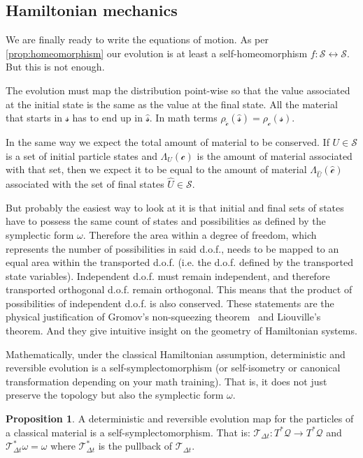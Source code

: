 \documentclass[smallextended]{svjour3}
\numberwithin{equation}{section}
\theoremstyle{definition}
\newtheorem{prop}[equation]{Proposition}
\begin{document}
\subsection{Hamiltonian mechanics}

We are finally ready to write the equations of motion. As per \ref{prop:homeomorphism} our evolution is at least a self-homeomorphism $f:\mathcal{S} \leftrightarrow \mathcal{S}$. But this is not enough.

The evolution must map the distribution point-wise so that the value associated at the initial state is the same as the value at the final state. All the material that starts in $\mathcal{s}$ has to end up in $\hat{\mathcal{s}}$. In math terms $\rho_{\hat{\mathcal{c}}} (\hat{\mathcal{s}}) = \rho_\mathcal{c}(\mathcal{s})$.

In the same way we expect the total amount of material to be conserved. If $U \in \mathcal{S}$ is a set of initial particle states and $\Lambda_U(\mathcal{c})$ is the amount of material associated with that set, then we expect it to be equal to the amount of material $\Lambda_{\hat{U}}(\hat{\mathcal{c}})$ associated with the set of final states $\hat{U} \in \mathcal{S}$.

But probably the easiest way to look at it is that initial and final sets of states have to possess the same count of states and possibilities as defined by the symplectic form $\omega$. Therefore the area within a degree of freedom, which represents the number of possibilities in said d.o.f., needs to be mapped to an equal area within the transported d.o.f. (i.e. the d.o.f. defined by the transported state variables). Independent d.o.f. must remain independent, and therefore transported orthogonal d.o.f. remain orthogonal. This means that the product of possibilities of independent d.o.f. is also conserved. These statements are the physical justification of Gromov's non-squeezing theorem~\cite{Gromov,deGosson,Stewart} and Liouville's theorem. And they give intuitive insight on the geometry of Hamiltonian systems.

Mathematically, under the classical Hamiltonian assumption,  deterministic and reversible evolution is a self-symplectomorphism (or self-isometry or canonical transformation depending on your math training). That is, it does not just preserve the topology but also the symplectic form $\omega$.

\begin{prop}\label{prop:symplectomorphism}
	A deterministic and reversible evolution map for the particles of a classical material is a self-symplectomorphism. That is: $\mathcal{T}_{\Delta t}: T^*\mathcal{Q} \rightarrow T^*\mathcal{Q}$ and $\mathcal{T}_{\Delta t}^*\omega = \omega$ where $\mathcal{T}_{\Delta t}^*$ is the pullback of $\mathcal{T}_{\Delta t}$.
\end{prop}
\end{document}
